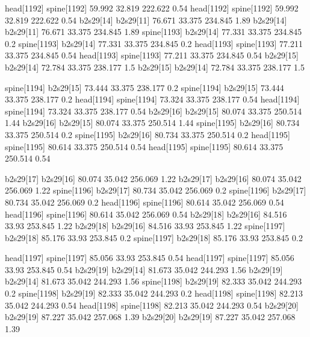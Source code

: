 head[1192]    spine[1192]    59.992    32.819    222.622    0.54
head[1192]    spine[1192]    59.992    32.819    222.622    0.54
b2s29[14]    b2s29[11]    76.671    33.375    234.845    1.89
b2s29[14]    b2s29[11]    76.671    33.375    234.845    1.89
spine[1193]    b2s29[14]    77.331    33.375    234.845    0.2
spine[1193]    b2s29[14]    77.331    33.375    234.845    0.2
head[1193]    spine[1193]    77.211    33.375    234.845    0.54
head[1193]    spine[1193]    77.211    33.375    234.845    0.54
b2s29[15]    b2s29[14]    72.784    33.375    238.177    1.5
b2s29[15]    b2s29[14]    72.784    33.375    238.177    1.5


spine[1194]    b2s29[15]    73.444    33.375    238.177    0.2
spine[1194]    b2s29[15]    73.444    33.375    238.177    0.2
head[1194]    spine[1194]    73.324    33.375    238.177    0.54
head[1194]    spine[1194]    73.324    33.375    238.177    0.54
b2s29[16]    b2s29[15]    80.074    33.375    250.514    1.44
b2s29[16]    b2s29[15]    80.074    33.375    250.514    1.44
spine[1195]    b2s29[16]    80.734    33.375    250.514    0.2
spine[1195]    b2s29[16]    80.734    33.375    250.514    0.2
head[1195]    spine[1195]    80.614    33.375    250.514    0.54
head[1195]    spine[1195]    80.614    33.375    250.514    0.54


b2s29[17]    b2s29[16]    80.074    35.042    256.069    1.22
b2s29[17]    b2s29[16]    80.074    35.042    256.069    1.22
spine[1196]    b2s29[17]    80.734    35.042    256.069    0.2
spine[1196]    b2s29[17]    80.734    35.042    256.069    0.2
head[1196]    spine[1196]    80.614    35.042    256.069    0.54
head[1196]    spine[1196]    80.614    35.042    256.069    0.54
b2s29[18]    b2s29[16]    84.516    33.93    253.845    1.22
b2s29[18]    b2s29[16]    84.516    33.93    253.845    1.22
spine[1197]    b2s29[18]    85.176    33.93    253.845    0.2
spine[1197]    b2s29[18]    85.176    33.93    253.845    0.2


head[1197]    spine[1197]    85.056    33.93    253.845    0.54
head[1197]    spine[1197]    85.056    33.93    253.845    0.54
b2s29[19]    b2s29[14]    81.673    35.042    244.293    1.56
b2s29[19]    b2s29[14]    81.673    35.042    244.293    1.56
spine[1198]    b2s29[19]    82.333    35.042    244.293    0.2
spine[1198]    b2s29[19]    82.333    35.042    244.293    0.2
head[1198]    spine[1198]    82.213    35.042    244.293    0.54
head[1198]    spine[1198]    82.213    35.042    244.293    0.54
b2s29[20]    b2s29[19]    87.227    35.042    257.068    1.39
b2s29[20]    b2s29[19]    87.227    35.042    257.068    1.39



